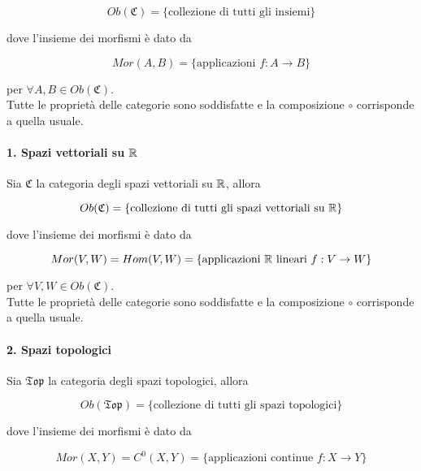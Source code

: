 \begin{equation}
	Ob(\mathfrak{C}) = \{ \text{collezione di tutti gli insiemi} \}
\end{equation}

dove l'insieme dei morfismi è dato da

\begin{equation}
	Mor(A,B) = \{ \text{applicazioni } f : A \to B \}
\end{equation}

per $ \forall A,B \in Ob(\mathfrak{C}) $.\\
Tutte le proprietà delle categorie sono soddisfatte e la composizione $ \circ $ corrisponde a quella usuale.

\paragraph{1. Spazi vettoriali su $ \mathbb{R} $}

Sia $ \mathfrak{C} $ la categoria degli spazi vettoriali su $ \mathbb{R} $, allora

\begin{equation}
	Ob(\mathfrak{C}) = \{ \text{collezione di tutti gli spazi vettoriali su } \mathbb{R} \}
\end{equation}

dove l'insieme dei morfismi è dato da

\begin{equation}
	Mor(V,W) = Hom(V,W) = \{ \text{applicazioni } \mathbb{R} \text{ lineari } f : V \to W \}
\end{equation}

per $ \forall V,W \in Ob(\mathfrak{C}) $.\\
Tutte le proprietà delle categorie sono soddisfatte e la composizione $ \circ $ corrisponde a quella usuale.

\paragraph{2. Spazi topologici}

Sia $ \mathfrak{Top} $ la categoria degli spazi topologici, allora

\begin{equation}
	Ob(\mathfrak{Top}) = \{ \text{collezione di tutti gli spazi topologici} \}
\end{equation}

dove l'insieme dei morfismi è dato da

\begin{equation}
	Mor(X,Y) = C^{0}(X,Y) = \{ \text{applicazioni continue } f : X \to Y \}
\end{equation}

